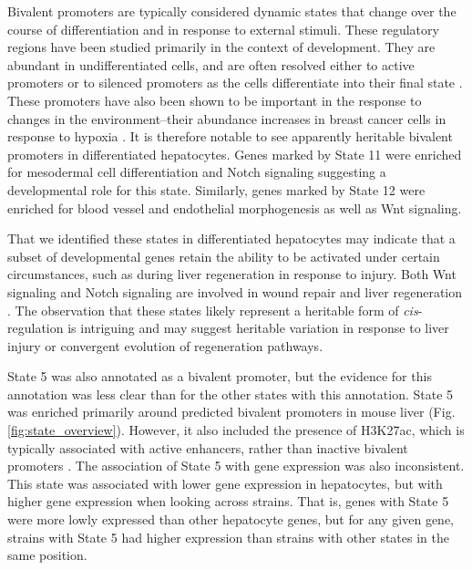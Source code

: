 \documentclass[
  11pt,
]{article}
\begin{document}
Bivalent promoters are typically considered dynamic states that change
over the course of differentiation and in response to external stimuli.
These regulatory regions have been studied primarily in the context of
development. They are abundant in undifferentiated cells, and are often
resolved either to active promoters or to silenced promoters as the
cells differentiate into their final state \citep{pmid23788621, 
pmid22513113}. These promoters have also been shown to be important in
the response to changes in the environment--their abundance increases in
breast cancer cells in response to hypoxia \citep{pmid27800026}. It is
therefore notable to see apparently heritable bivalent promoters in
differentiated hepatocytes. Genes marked by State 11 were enriched for
mesodermal cell differentiation and Notch signaling suggesting a
developmental role for this state. Similarly, genes marked by State 12
were enriched for blood vessel and endothelial morphogenesis as well as
Wnt signaling.

That we identified these states in differentiated hepatocytes may
indicate that a subset of developmental genes retain the ability to be
activated under certain circumstances, such as during liver regeneration
in response to injury. Both Wnt signaling and Notch signaling are
involved in wound repair \citep{shi2015wnt, 
chigurupati2007involvement, whyte2012wnt} and liver regeneration
\citep{yue2018role, hu2021wnt, thompson2007wnt}. The observation that
these states likely represent a heritable form of
\textit{cis}-regulation is intriguing and may suggest heritable
variation in response to liver injury or convergent evolution of
regeneration pathways.

State 5 was also annotated as a bivalent promoter, but the evidence for
this annotation was less clear than for the other states with this
annotation. State 5 was enriched primarily around predicted bivalent
promoters in mouse liver (Fig. \ref{fig:state_overview}). However, it
also included the presence of H3K27ac, which is typically associated
with active enhancers, rather than inactive bivalent promoters
\citep{creyghton2010histone, pmid23788621}. The association of State 5
with gene expression was also inconsistent. This state was associated
with lower gene expression in hepatocytes, but with higher gene
expression when looking across strains. That is, genes with State 5 were
more lowly expressed than other hepatocyte genes, but for any given
gene, strains with State 5 had higher expression than strains with other
states in the same position.
\end{document}
